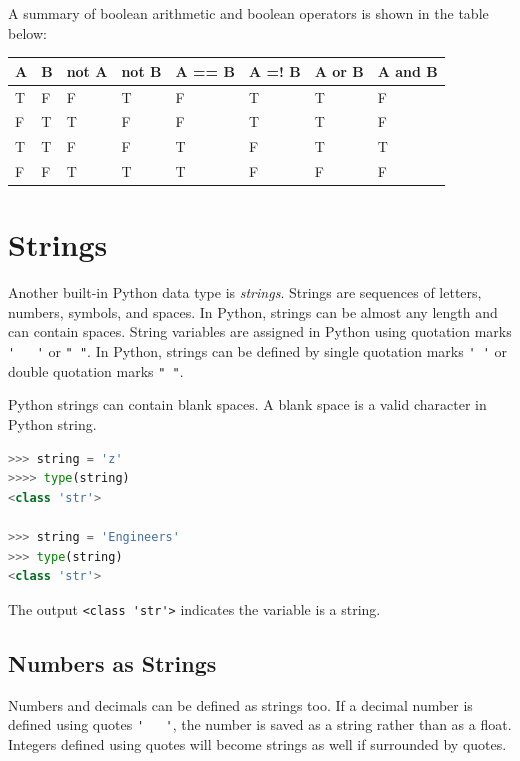 \documentclass{book}
\begin{document}
    
        A summary of boolean arithmetic and boolean operators is shown in the
table below:

\begin{longtable}[]{@{}llllllll@{}}
\toprule
A & B & not A & not B & A == B & A =! B & A or B & A and
B\tabularnewline
\midrule
\endhead
T & F & F & T & F & T & T & F\tabularnewline
F & T & T & F & F & T & T & F\tabularnewline
T & T & F & F & T & F & T & T\tabularnewline
F & F & T & T & T & F & F & F\tabularnewline
\bottomrule
\end{longtable}
    




    
        \section{Strings}\label{strings}
    




    
        Another built-in Python data type is \emph{strings}. Strings are
sequences of letters, numbers, symbols, and spaces. In Python, strings
can be almost any length and can contain spaces. String variables are
assigned in Python using quotation marks \lstinline!'   '! or
\lstinline!" "!. In Python, strings can be defined by single quotation
marks \lstinline!' '! or double quotation marks \lstinline!" "!.

Python strings can contain blank spaces. A blank space is a valid
character in Python string.

\begin{lstlisting}[language=Python]
>>> string = 'z'
>>>> type(string)
<class 'str'>

>>> string = 'Engineers'
>>> type(string)
<class 'str'>
\end{lstlisting}

The output \lstinline!<class 'str'>! indicates the variable is a string.
    




    
        \subsection{Numbers as Strings}\label{numbers-as-strings}

Numbers and decimals can be defined as strings too. If a decimal number
is defined using quotes \lstinline!'   '!, the number is saved as a
string rather than as a float. Integers defined using quotes will become
strings as well if surrounded by quotes.
\end{document}
